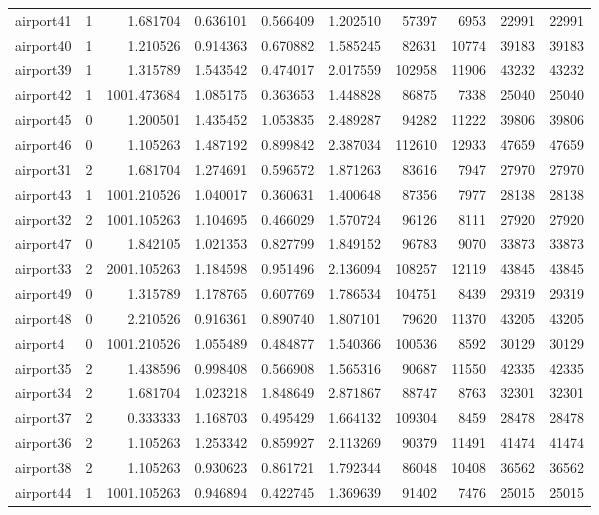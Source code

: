 \begin{longtable}{|l|r|r|r|r|r|r|r|r|r|}
airport41 & 1 & 1.681704 & 0.636101 & 0.566409 & 1.202510 & 57397 & 6953 & 22991 & 22991 \\
airport40 & 1 & 1.210526 & 0.914363 & 0.670882 & 1.585245 & 82631 & 10774 & 39183 & 39183 \\
airport39 & 1 & 1.315789 & 1.543542 & 0.474017 & 2.017559 & 102958 & 11906 & 43232 & 43232 \\
airport42 & 1 & 1001.473684 & 1.085175 & 0.363653 & 1.448828 & 86875 & 7338 & 25040 & 25040 \\
airport45 & 0 & 1.200501 & 1.435452 & 1.053835 & 2.489287 & 94282 & 11222 & 39806 & 39806 \\
airport46 & 0 & 1.105263 & 1.487192 & 0.899842 & 2.387034 & 112610 & 12933 & 47659 & 47659 \\
airport31 & 2 & 1.681704 & 1.274691 & 0.596572 & 1.871263 & 83616 & 7947 & 27970 & 27970 \\
airport43 & 1 & 1001.210526 & 1.040017 & 0.360631 & 1.400648 & 87356 & 7977 & 28138 & 28138 \\
airport32 & 2 & 1001.105263 & 1.104695 & 0.466029 & 1.570724 & 96126 & 8111 & 27920 & 27920 \\
airport47 & 0 & 1.842105 & 1.021353 & 0.827799 & 1.849152 & 96783 & 9070 & 33873 & 33873 \\
airport33 & 2 & 2001.105263 & 1.184598 & 0.951496 & 2.136094 & 108257 & 12119 & 43845 & 43845 \\
airport49 & 0 & 1.315789 & 1.178765 & 0.607769 & 1.786534 & 104751 & 8439 & 29319 & 29319 \\
airport48 & 0 & 2.210526 & 0.916361 & 0.890740 & 1.807101 & 79620 & 11370 & 43205 & 43205 \\
airport4 & 0 & 1001.210526 & 1.055489 & 0.484877 & 1.540366 & 100536 & 8592 & 30129 & 30129 \\
airport35 & 2 & 1.438596 & 0.998408 & 0.566908 & 1.565316 & 90687 & 11550 & 42335 & 42335 \\
airport34 & 2 & 1.681704 & 1.023218 & 1.848649 & 2.871867 & 88747 & 8763 & 32301 & 32301 \\
airport37 & 2 & 0.333333 & 1.168703 & 0.495429 & 1.664132 & 109304 & 8459 & 28478 & 28478 \\
airport36 & 2 & 1.105263 & 1.253342 & 0.859927 & 2.113269 & 90379 & 11491 & 41474 & 41474 \\
airport38 & 2 & 1.105263 & 0.930623 & 0.861721 & 1.792344 & 86048 & 10408 & 36562 & 36562 \\
airport44 & 1 & 1001.105263 & 0.946894 & 0.422745 & 1.369639 & 91402 & 7476 & 25015 & 25015 \\

\end{longtable}
